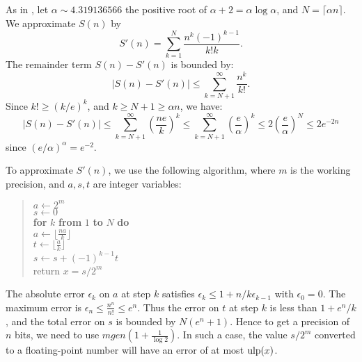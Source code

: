 \documentclass[12pt]{amsart}
\def\q{\hspace*{5mm}}
\def\ulp{{\rm ulp}}
\def\Paragraph#1{\noindent {\sc #1}}
\begin{document}
\Paragraph{Evaluation of $S(n)$.}
As in \cite{Brent78}, let $\alpha \sim 4.319136566$ the positive root
of $\alpha + 2 = \alpha \log \alpha$, and $N = \lceil \alpha n \rceil$.
We approximate $S(n)$ by
\[ S'(n) = \sum_{k=1}^{N} \frac{n^k (-1)^{k-1}}{k! k}. \]
The remainder term $S(n) - S'(n)$ is bounded by:
\[ |S(n) - S'(n)| \le \sum_{k=N+1}^{\infty} \frac{n^k}{k!}. \]
Since $k! \ge (k/e)^k$, and $k \ge N+1 \ge \alpha n$, we have:
\[ |S(n) - S'(n)| \le \sum_{k=N+1}^{\infty} \left( \frac{n e}{k} \right)^k
                  \le \sum_{k=N+1}^{\infty} \left( \frac{e}{\alpha} \right)^k
                  \le 2 \left( \frac{e}{\alpha} \right)^N
                  \le 2 e^{-2n} \]
since $(e/\alpha)^{\alpha} = e^{-2}$.

To approximate $S'(n)$, we use the following algorithm, where $m$ is the
working precision, and $a, s, t$ are integer variables:
\begin{quote}
$a \leftarrow 2^m$ \\
$s \leftarrow 0$ \\
{\bf for} $k$ {\bf from} $1$ {\bf to} $N$ {\bf do} \\
\q $a \leftarrow \lfloor \frac{n a}{k} \rfloor$ \\
\q $t \leftarrow \lfloor \frac{a}{k} \rfloor$ \\
\q $s \leftarrow s + (-1)^{k-1} t$ \\
return $x = s/2^m$
\end{quote}
The absolute error $\epsilon_k$ on $a$ at step $k$ satisfies
$\epsilon_k \le 1 + n/k \epsilon_{k-1}$ with $\epsilon_0=0$.
The maximum error is $\epsilon_n \le \frac{n^n}{n!} \le e^n$.
Thus the error on $t$ at step $k$ is less than $1 + e^n/k$,
and the total error on $s$ is bounded by $N (e^n + 1)$.
Hence to get a precision of $n$ bits, we need to use
$m ge n (1 + \frac{1}{\log 2})$.
In such a case, the value $s/2^m$ converted to a floating-point number
will have an error of at most $\ulp(x)$.
\end{document}
